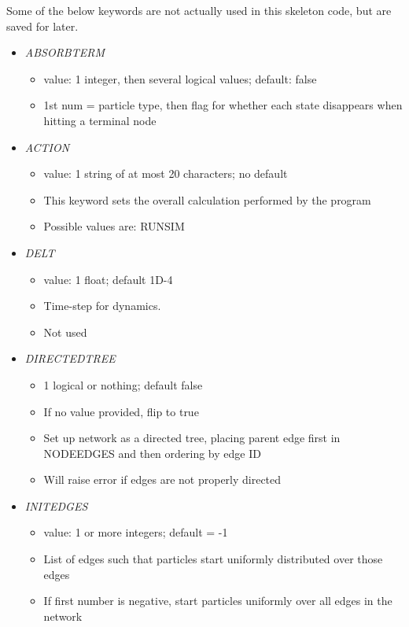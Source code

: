 \documentclass[12pt]{article}
\begin{document}
Some of the below keywords are not actually used in this skeleton code, but are saved for later.

\begin{itemize}
%
\item {\it ABSORBTERM}
\begin{itemize}
	\item value: 1 integer, then several logical values; default: false
	\item 1st num = particle type, then flag for whether each state disappears when hitting a terminal node
\end{itemize}
%
\item {\it ACTION}
  \begin{itemize}
    \item  value: 1 string of at most 20 characters; no default
    \item This keyword sets the overall calculation performed by the program 
    \item Possible values are: RUNSIM
  \end{itemize}
%
\item {\it DELT}
    \begin{itemize}
      \item  value: 1 float; default 1D-4
      \item Time-step for dynamics. 
      \item Not used
    \end{itemize}
%
\item {\it DIRECTEDTREE}
\begin{itemize}
	\item 1 logical or nothing; default false
	\item If no value provided, flip to true
	\item Set up network as a directed tree, placing parent edge first in NODEEDGES and then ordering by edge ID
	\item Will raise error if edges are not properly directed
\end{itemize}
%
\item {\it INITEDGES}
\begin{itemize}
	\item value: 1 or more integers; default = -1
	\item List of edges such that particles start uniformly distributed over those edges
	\item If first number is negative, start particles uniformly over all edges in the network
\end{itemize}

\end{itemize}
\end{document}
